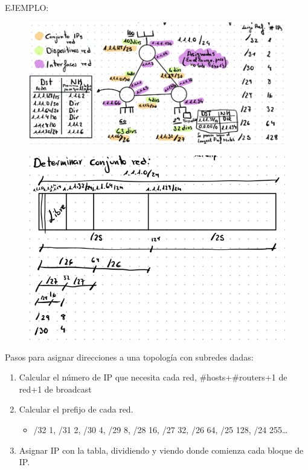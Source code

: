 \documentclass[12pt, twoside, openright]{report} %
\begin{document}
EJEMPLO:
\begin{figure}[H]
	{\includegraphics[scale=.3]{Untitled 30.png}}
\end{figure}
\begin{figure}[H]
	{\includegraphics[scale=.3]{Untitled 31.png}}
\end{figure}

Pasos para asignar direcciones a una topología con subredes dadas:

\begin{enumerate}
	\def\labelenumi{\arabic{enumi}.}
	\item Calcular el número de IP que necesita cada red,
	      \#hosts+\#routers+1 de red+1 de broadcast
	\item Calcular el prefijo de cada red.

	      \begin{itemize}
		      \item /32 1, /31 2, /30 4, /29 8, /28 16, /27 32, /26 64, /25 128, /24
		            255\ldots{}
	      \end{itemize}
	\item Asignar IP con la tabla, dividiendo y viendo donde comienza cada
	      bloque de IP.
\end{enumerate}
\end{document}
